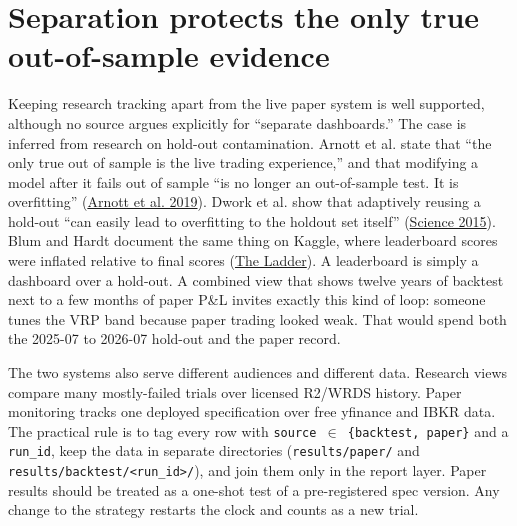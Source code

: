 \documentclass{article}
\begin{document}
\section{Separation protects the only true out-of-sample evidence}

Keeping research tracking apart from the live paper system is well supported, although no source argues explicitly for ``separate dashboards.'' The case is inferred from research on hold-out contamination. Arnott et al. state that ``the only true out of sample is the live trading experience,'' and that modifying a model after it fails out of sample ``is no longer an out-of-sample test. It is overfitting'' (\href{https://people.duke.edu/~charvey/Research/Published_Papers/P138_A_backtesting_protocol.pdf}{Arnott et al. 2019}). Dwork et al. show that adaptively reusing a hold-out ``can easily lead to overfitting to the holdout set itself'' (\href{https://www.science.org/doi/10.1126/science.aaa9375}{Science 2015}). Blum and Hardt document the same thing on Kaggle, where leaderboard scores were inflated relative to final scores (\href{https://arxiv.org/pdf/1502.04585}{The Ladder}). A leaderboard is simply a dashboard over a hold-out. A combined view that shows twelve years of backtest next to a few months of paper P\&L invites exactly this kind of loop: someone tunes the VRP band because paper trading looked weak. That would spend both the 2025-07 to 2026-07 hold-out and the paper record.

The two systems also serve different audiences and different data. Research views compare many mostly-failed trials over licensed R2/\allowbreak{}WRDS history. Paper monitoring tracks one deployed specification over free yfinance and IBKR data. The practical rule is to tag every row with \texttt{source \ensuremath{\in} \{backtest,\allowbreak{} paper\}} and a \texttt{run\_\allowbreak{}id}, keep the data in separate directories (\texttt{results/\allowbreak{}paper/\allowbreak{}} and \texttt{results/\allowbreak{}backtest/\allowbreak{}<run\_\allowbreak{}id>/\allowbreak{}}), and join them only in the report layer. Paper results should be treated as a one-shot test of a pre-registered spec version. Any change to the strategy restarts the clock and counts as a new trial.
\end{document}
